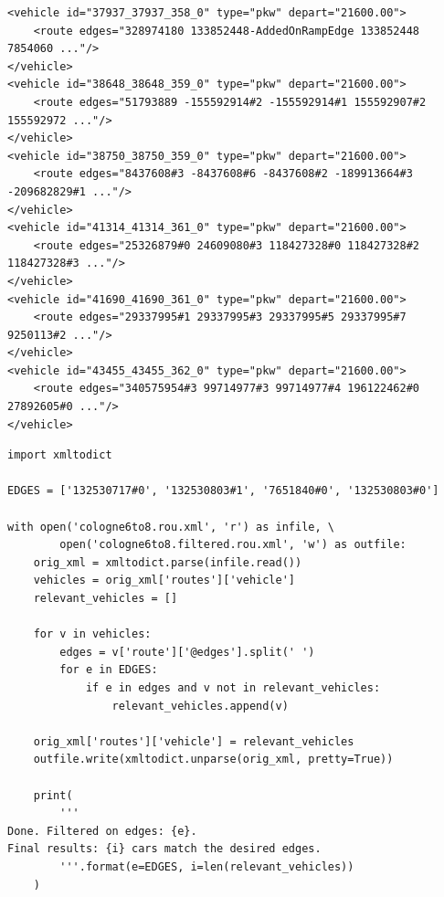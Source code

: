 \documentclass[11pt,letterpaper]{article}
\begin{document}
\noindent\begin{minipage}{\linewidth}
\begin{lstlisting}[style=m_xml, label={sumo:routes}, caption={Extracto de trazas vehiculares del escenario TAPAS Cologne. Cada vehículo tiene asociada una ruta, la cual describe el camino que recorre este desde su origen hasta su destino.}]
<vehicle id="37937_37937_358_0" type="pkw" depart="21600.00">
    <route edges="328974180 133852448-AddedOnRampEdge 133852448 7854060 ..."/>
</vehicle>
<vehicle id="38648_38648_359_0" type="pkw" depart="21600.00">
    <route edges="51793889 -155592914#2 -155592914#1 155592907#2 155592972 ..."/>
</vehicle>
<vehicle id="38750_38750_359_0" type="pkw" depart="21600.00">
    <route edges="8437608#3 -8437608#6 -8437608#2 -189913664#3 -209682829#1 ..."/>
</vehicle>
<vehicle id="41314_41314_361_0" type="pkw" depart="21600.00">
    <route edges="25326879#0 24609080#3 118427328#0 118427328#2 118427328#3 ..."/>
</vehicle>
<vehicle id="41690_41690_361_0" type="pkw" depart="21600.00">
    <route edges="29337995#1 29337995#3 29337995#5 29337995#7 9250113#2 ..."/>
</vehicle>
<vehicle id="43455_43455_362_0" type="pkw" depart="21600.00">
    <route edges="340575954#3 99714977#3 99714977#4 196122462#0 27892605#0 ..."/>
</vehicle>
\end{lstlisting}
\end{minipage}

\noindent\begin{minipage}{\linewidth}
\begin{lstlisting}[style=mPython, caption={Código de extracción de vehículos relevantes.}, label={sumo:py_filter}]
import xmltodict

EDGES = ['132530717#0', '132530803#1', '7651840#0', '132530803#0']

with open('cologne6to8.rou.xml', 'r') as infile, \
        open('cologne6to8.filtered.rou.xml', 'w') as outfile:
    orig_xml = xmltodict.parse(infile.read())
    vehicles = orig_xml['routes']['vehicle']
    relevant_vehicles = []

    for v in vehicles:
        edges = v['route']['@edges'].split(' ')
        for e in EDGES:
            if e in edges and v not in relevant_vehicles:
                relevant_vehicles.append(v)

    orig_xml['routes']['vehicle'] = relevant_vehicles
    outfile.write(xmltodict.unparse(orig_xml, pretty=True))

    print(
        '''
Done. Filtered on edges: {e}.
Final results: {i} cars match the desired edges.
        '''.format(e=EDGES, i=len(relevant_vehicles))
    )
\end{lstlisting}
\end{minipage}
\end{document}
